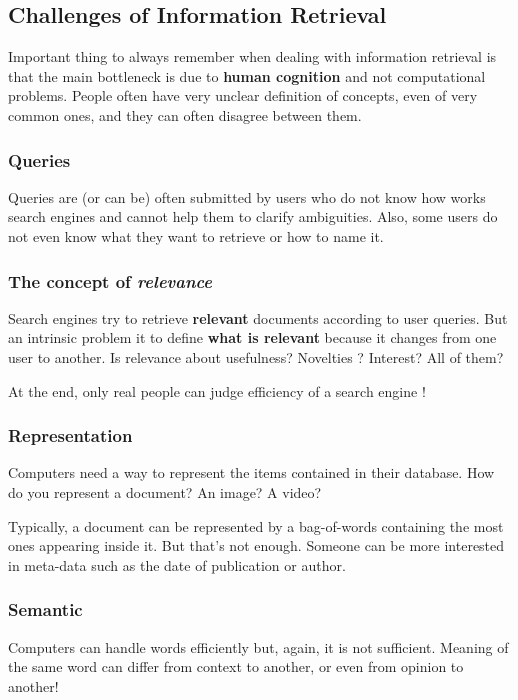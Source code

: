 \subsection{Challenges of Information Retrieval}

Important thing to always remember when dealing with information retrieval is that the main bottleneck is due to {\bf human cognition} and not computational problems. People often have very unclear definition of concepts, even of very common ones, and they can often disagree between them.

\subsubsection{Queries}

Queries are (or can be) often submitted by users who do not know how works search engines and cannot help them to clarify ambiguities. Also, some users do not even know what they want to retrieve or how to name it.

\subsubsection{The concept of {\it relevance}}

Search engines try to retrieve {\bf relevant} documents according to user queries. But an intrinsic problem it to define {\bf what is relevant} because it changes from one user to another. Is relevance about usefulness? Novelties ? Interest? All of them?

At the end, only real people can judge efficiency of a search engine !

\subsubsection{Representation}

Computers need a way to represent the items contained in their database. How do you represent a document? An image? A video?

Typically, a document can be represented by a bag-of-words containing the most ones appearing inside it. But that's not enough. Someone can be more interested in meta-data such as the date of publication or author.

\subsubsection{Semantic}

Computers can handle words efficiently but, again, it is not sufficient. Meaning of the same word can differ from context to another, or even from opinion to another! 

